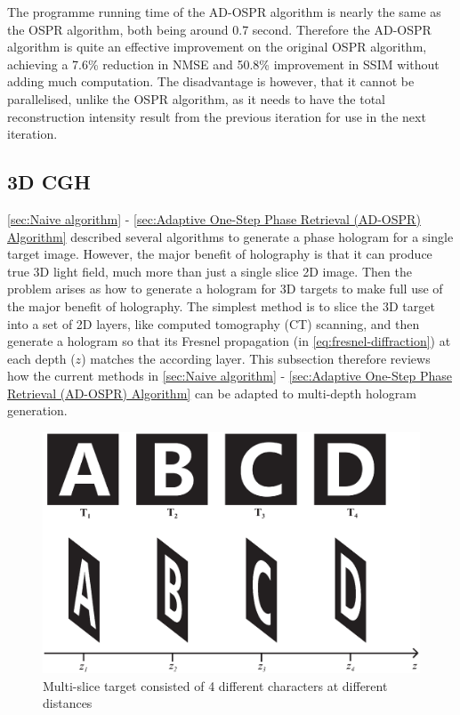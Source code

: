 The programme running time of the AD-OSPR algorithm is nearly the same as the OSPR algorithm, both being around 0.7 second. Therefore the AD-OSPR algorithm is quite an effective improvement on the original OSPR algorithm, achieving a 7.6\% reduction in NMSE and 50.8\% improvement in SSIM without adding much computation. The disadvantage is however, that it cannot be parallelised, unlike the OSPR algorithm, as it needs to have the total reconstruction intensity result from the previous iteration for use in the next iteration.


\newpage
\subsection{3D CGH}
\cref{sec:Naive algorithm} - \cref{sec:Adaptive One-Step Phase Retrieval (AD-OSPR) Algorithm} described several algorithms to generate a phase hologram for a single target image. However, the major benefit of holography is that it can produce true 3D light field, much more than just a single slice 2D image. Then the problem arises as how to generate a hologram for 3D targets to make full use of the major benefit of holography. The simplest method is to slice the 3D target into a set of 2D layers, like computed tomography (CT) scanning, and then generate a hologram so that its Fresnel propagation (in \cref{eq:fresnel-diffraction}) at each depth ($z$) matches the according layer. This subsection therefore reviews how the current methods in \cref{sec:Naive algorithm} - \cref{sec:Adaptive One-Step Phase Retrieval (AD-OSPR) Algorithm} can be adapted to multi-depth hologram generation.

\begin{figure}[H]
	\centering
	\includegraphics[width=1.0\textwidth]{ABCD/ABCD_target.eps}
	\caption{Multi-slice target consisted of 4 different characters at different distances}
	\label{fig:ABCD_target}
\end{figure}


